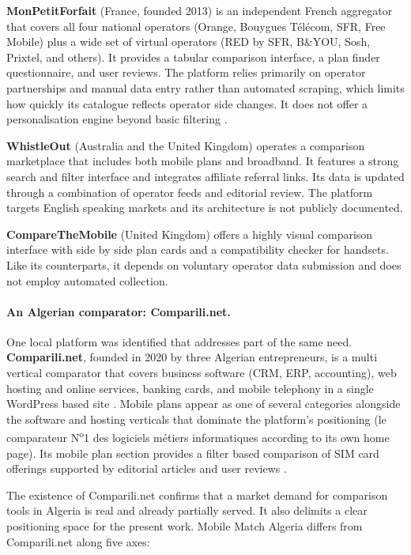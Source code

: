 \textbf{MonPetitForfait} (France, founded 2013) is an independent French aggregator that covers all four national operators (Orange, Bouygues Télécom, SFR, Free Mobile) plus a wide set of virtual operators (RED by SFR, B\&YOU, Sosh, Prixtel, and others). It provides a tabular comparison interface, a plan finder questionnaire, and user reviews. The platform relies primarily on operator partnerships and manual data entry rather than automated scraping, which limits how quickly its catalogue reflects operator side changes. It does not offer a personalisation engine beyond basic filtering \parencite{MonPetitForfait2026}.

\textbf{WhistleOut} (Australia and the United Kingdom) operates a comparison marketplace that includes both mobile plans and broadband. It features a strong search and filter interface and integrates affiliate referral links. Its data is updated through a combination of operator feeds and editorial review. The platform targets English speaking markets and its architecture is not publicly documented.

\textbf{CompareTheMobile} (United Kingdom) offers a highly visual comparison interface with side by side plan cards and a compatibility checker for handsets. Like its counterparts, it depends on voluntary operator data submission and does not employ automated collection.

\paragraph{An Algerian comparator: Comparili.net.}
One local platform was identified that addresses part of the same need. \textbf{Comparili.net}, founded in 2020 by three Algerian entrepreneurs, is a multi vertical comparator that covers business software (CRM, ERP, accounting), web hosting and online services, banking cards, and mobile telephony in a single WordPress based site \parencite{Comparili2024}. Mobile plans appear as one of several categories alongside the software and hosting verticals that dominate the platform's positioning (\guillemotleft{}le comparateur N\textsuperscript{o}1 des logiciels métiers informatiques\guillemotright{} according to its own home page). Its mobile plan section provides a filter based comparison of SIM card offerings supported by editorial articles and user reviews \parencite{Comparili2024}.

The existence of Comparili.net confirms that a market demand for comparison tools in Algeria is real and already partially served. It also delimits a clear positioning space for the present work. Mobile Match Algeria differs from Comparili.net along five axes:

